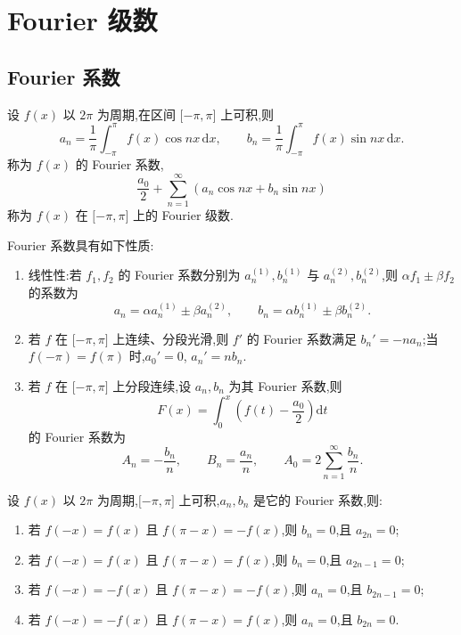 \newpage

\section{Fourier 级数}


\subsection{Fourier 系数}

设 $f(x)$ 以 $2\pi$ 为周期,在区间 $\lbrack -\pi,\pi\rbrack$ 上可积,则
\[
    a_n=\dfrac{1}{\pi}\int_{-\pi}^{\pi}f(x)\cos nx\,\mathrm{d}x,
    \qquad
    b_n=\dfrac{1}{\pi}\int_{-\pi}^{\pi}f(x)\sin nx\,\mathrm{d}x.
\]
称为 $f(x)$ 的 Fourier 系数,
\[
    \dfrac{a_0}{2}+\sum\limits_{n=1}^{\infty}(a_n\cos nx+b_n\sin nx)
\]
称为 $f(x)$ 在 $\lbrack -\pi,\pi\rbrack$ 上的 Fourier 级数.

\begin{proposition}[\markstar]
    Fourier 系数具有如下性质:
    \begin{enumerate}
        \item 线性性:若 $f_1,f_2$ 的 Fourier 系数分别为 $a_n^{(1)},b_n^{(1)}$ 与 $a_n^{(2)},b_n^{(2)}$,则 $\alpha f_1\pm\beta f_2$ 的系数为
              \[
                  a_n=\alpha a_n^{(1)}\pm\beta a_n^{(2)},
                  \qquad
                  b_n=\alpha b_n^{(1)}\pm\beta b_n^{(2)}.
              \]
        \item 若 $f$ 在 $\lbrack -\pi,\pi\rbrack$ 上连续、分段光滑,则 $f'$ 的 Fourier 系数满足 $b_n'=-na_n$;当 $f(-\pi)=f(\pi)$ 时,$a_0'=0$, $a_n'=nb_n$.
        \item 若 $f$ 在 $\lbrack -\pi,\pi\rbrack$ 上分段连续,设 $a_n,b_n$ 为其 Fourier 系数,则
              \[
                  F(x)=\int_0^x\left(f(t)-\dfrac{a_0}{2}\right)\mathrm{d}t
              \]
              的 Fourier 系数为
              \[
                  A_n=-\dfrac{b_n}{n},
                  \qquad
                  B_n=\dfrac{a_n}{n},
                  \qquad
                  A_0=2\sum\limits_{n=1}^{\infty}\dfrac{b_n}{n}.
              \]
    \end{enumerate}
\end{proposition}

\begin{proposition}[\markstar]
    设 $f(x)$ 以 $2\pi$ 为周期,$\lbrack -\pi,\pi\rbrack$ 上可积,$a_n,b_n$ 是它的 Fourier 系数,则:
    \begin{enumerate}
        \item 若 $f(-x)=f(x)$ 且 $f(\pi-x)=-f(x)$,则 $b_n=0$,且 $a_{2n}=0$;
        \item 若 $f(-x)=f(x)$ 且 $f(\pi-x)=f(x)$,则 $b_n=0$,且 $a_{2n-1}=0$;
        \item 若 $f(-x)=-f(x)$ 且 $f(\pi-x)=-f(x)$,则 $a_n=0$,且 $b_{2n-1}=0$;
        \item 若 $f(-x)=-f(x)$ 且 $f(\pi-x)=f(x)$,则 $a_n=0$,且 $b_{2n}=0$.
    \end{enumerate}
\end{proposition}

